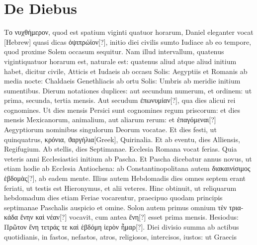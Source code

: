 \section{De Diebus}
\textgreek{Το νυχθήμερον},
quod est spatium viginti quatuor horarum, Daniel
eleganter vocat \texthebrew{[Hebrew]} quasi dicas
 \textgreek{ὀψιπρώϊον[?]}, initio diei civilis
sumto Iudiace ab eo tempore, quod proxime Solem occasum
sequitur.
Nam illud intervallum, quatenus vigintiquatuor horarum est,
naturale est: quatenus aliud atque aliud initium habet, dicitur civile,
Atticis et Iudaeis ab occasu Solis: Aegyptiis et Romanis ab media nocte:
Chaldaeis Genethliacis ab ortu Solis: Umbris ab meridie initium
sumentibus.
Dierum notationes duplices: aut secundum numerum, et
ordinem: ut prima, secunda, tertia mensis.
Aut secudum \textgreek{ἐπωνυμίαν[?]},
qua dies alicui rei cognomines.
Ut dies mensis Persici sunt cognomines
regum priscorum: et dies mensis Mexicanorum, animalium, aut aliarum
rerum: et \textgreek{ἐπαγόμεναι[?]} Aegyptiorum nominibus singulorum Deorum
vocatae.
Et dies festi, ut quinquatrus, \textgreek{κρόνια},
\textgreek{ϑαργήλια[Greek]}, Quirinalia.
Et ab eventu, dies Alliensis, Regifugium.
Ab stellis, dies Septimanae.
Ecclesia Romana vocat ferias.
Quia veteris anni Ecclesiastici initium
ab Pascha.
Et Pascha dicebatur annus novus, ut etiam hodie ab Ecclesia
Antiochena: ab Constantinopolitana autem \textgreek{διακαινίσιμος ἑβδομὰς[?]},
ab eadem mente.
Illius autem Hebdomadis dies omnes septem erant
feriati, ut testis est Hieronymus, et alii veteres.
Hinc obtinuit, ut reliquarum
hebdomadum dies etiam Feriae vocarentur, praecipuo quodam
principis septimanae Paschalis auspicio et omine.
Solon autem
primus omnium \textgreek{τὲν τριακάδα ἔνην καὶ νέαν[?]} vocavit,
 cum antea \textgreek{ἔνη[?]} esset
prima mensis.
Hesiodus: \textgreek{Πρῶτον ἔνη τετράς τε καὶ ἑβδόμη ἰερὸν ἦμαρ[?]}.
Diei divisio summa ab actibus quotidianis, in fastos, nefastos, atros,
religiosos, intercisos, iustos: ut Graecis
